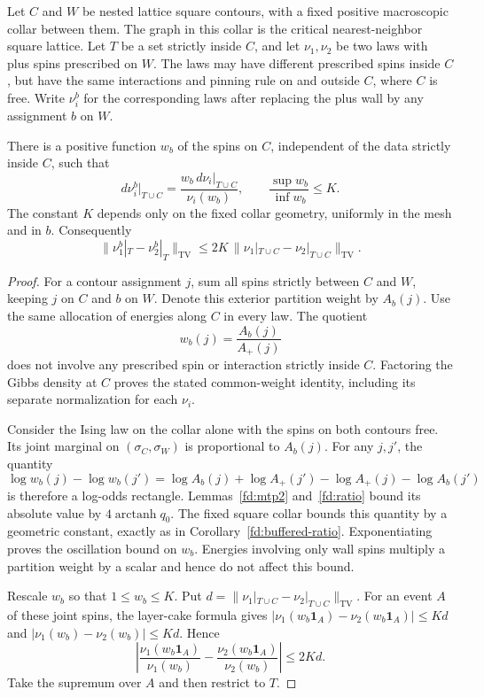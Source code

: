 \begin{lemma}
\label{fd:outer-wall-weight}
Let $C$ and $W$ be nested lattice square contours, with a fixed positive
macroscopic collar between them. The graph in this collar is the critical
nearest-neighbor square lattice. Let $T$ be a set strictly inside $C$,
and let $\nu_1,\nu_2$ be two laws with plus spins prescribed on $W$.
The laws may have different prescribed spins inside $C$, but have the
same interactions and pinning rule on and outside $C$, where $C$ is free.
Write $\nu_i^b$ for the corresponding laws after replacing the plus wall
by any assignment $b$ on $W$.

There is a positive function $w_b$ of the spins on $C$, independent of
the data strictly inside $C$, such that
\[
 d\nu_i^b\big|_{T\cup C}
 =\frac{w_b\,d\nu_i\big|_{T\cup C}}{\nu_i(w_b)},
 \qquad
 \frac{\sup w_b}{\inf w_b}\le K.
\]
The constant $K$ depends only on the fixed collar geometry, uniformly
in the mesh and in $b$. Consequently
\[
 \|\nu_1^b|_T-\nu_2^b|_T\|_{\mathrm{TV}}
 \le 2K\,
 \|\nu_1|_{T\cup C}-\nu_2|_{T\cup C}\|_{\mathrm{TV}}.
\]
\end{lemma}

\begin{proof}
For a contour assignment $j$, sum all spins strictly between $C$ and
$W$, keeping $j$ on $C$ and $b$ on $W$. Denote this exterior partition
weight by $A_b(j)$. Use the same allocation of energies along $C$ in
every law. The quotient
\[
                       w_b(j)=\frac{A_b(j)}{A_+(j)}
\]
does not involve any prescribed spin or interaction strictly inside
$C$. Factoring the Gibbs density at $C$ proves the stated common-weight
identity, including its separate normalization for each $\nu_i$.

Consider the Ising law on the collar alone with the spins on both
contours free. Its joint marginal on $(\sigma_C,\sigma_W)$ is
proportional to $A_b(j)$. For any $j,j'$, the quantity
\[
 \log w_b(j)-\log w_b(j')
 =\log A_b(j)+\log A_+(j')
  -\log A_+(j)-\log A_b(j')
\]
is therefore a log-odds rectangle. Lemmas~\ref{fd:mtp2}
and~\ref{fd:ratio} bound its absolute value by
$4\operatorname{arctanh}q_0$. The fixed square collar bounds this
quantity by a geometric constant, exactly as in
Corollary~\ref{fd:buffered-ratio}. Exponentiating proves the oscillation
bound on $w_b$. Energies involving only wall spins multiply a partition
weight by a scalar and hence do not affect this bound.

Rescale $w_b$ so that $1\le w_b\le K$. Put
$d=\|\nu_1|_{T\cup C}-\nu_2|_{T\cup C}\|_{\mathrm{TV}}$.
For an event $A$ of these joint spins, the layer-cake formula gives
$|\nu_1(w_b\mathbf1_A)-\nu_2(w_b\mathbf1_A)|\le Kd$ and
$|\nu_1(w_b)-\nu_2(w_b)|\le Kd$. Hence
\[
 \left|
 \frac{\nu_1(w_b\mathbf1_A)}{\nu_1(w_b)}
 -\frac{\nu_2(w_b\mathbf1_A)}{\nu_2(w_b)}
 \right|\le 2Kd.
\]
Take the supremum over $A$ and then restrict to $T$.
\end{proof}


